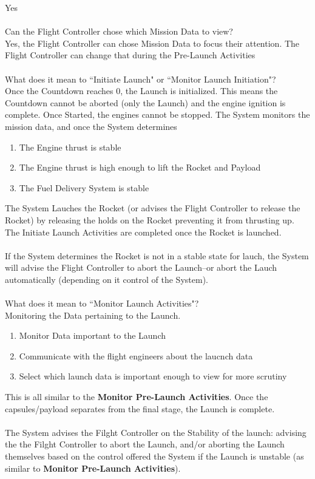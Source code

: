 \documentclass[letterpaper]{article}
\begin{document}
Yes\\\\
Can the Flight Controller chose which Mission Data to view?\\
Yes, the Flight Controller can chose Mission Data to focus their
attention.  The Flight Controller can change that during the Pre-Launch
Activities\\\\
What does it mean to ``Initiate Launch" or ``Monitor Launch
Initiation"?\\
Once the Countdown reaches 0, the Launch is initialized.  This means
the Countdown cannot be aborted (only the Launch) and the engine
ignition is complete.  Once Started, the engines cannot be stopped.
The System monitors the mission data, and once the System determines
\begin{enumerate}
\item The Engine thrust is stable
\item The Engine thrust is high enough to lift the Rocket and Payload
\item The Fuel Delivery System is stable
\end{enumerate}
The System Lauches the Rocket (or advises the Flight Controller to
release the Rocket) by releasing the holds on the Rocket preventing it
from thrusting up.  The Initiate Launch Activities are completed once
the Rocket is launched.\\\\
If the System determines the Rocket is not in
a stable state for lauch, the System will advise the Flight Controller
to abort the Launch--or abort the Lauch automatically (depending
on it control of the System).\\\\
What does it mean to ``Monitor Launch Activities"?\\
Monitoring the Data pertaining to the Launch.  
\begin{enumerate}
\item Monitor Data important to the Launch
\item Communicate with the flight engineers about the laucnch data
\item Select which launch data is important enough to view for more
scrutiny
\end{enumerate}
This is all similar to the \textbf{Monitor Pre-Launch Activities}.
Once the capsules/payload
separates from the final stage, the Launch is complete.\\\\
The System advises the Filght Controller on the Stability of the
launch:  advising the the Filght Controller to abort the Launch, and/or
aborting the Launch themselves based on the control offered the System
if the Launch is unstable (as similar to \textbf{Monitor Pre-Launch
Activities}).
\end{document}
